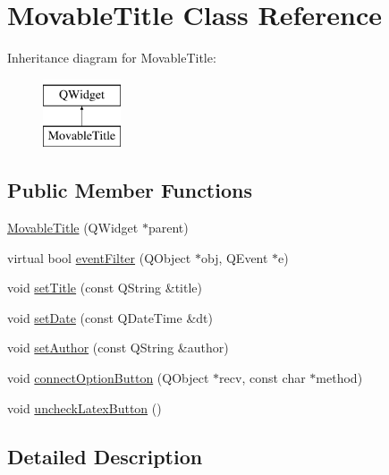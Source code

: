 \hypertarget{classMovableTitle}{\section{Movable\+Title Class Reference}
\label{classMovableTitle}
}
Inheritance diagram for Movable\+Title\+:\begin{figure}[H]
\begin{center}
\leavevmode
\includegraphics[height=2.000000cm]{classMovableTitle}
\end{center}
\end{figure}
\subsection*{Public Member Functions}
\begin{DoxyCompactItemize}
\item 
\hyperlink{classMovableTitle_a7e16a2ffdb1390da7703a866f8c313e8}{Movable\+Title} (Q\+Widget $\ast$parent)
\item 
virtual bool \hyperlink{classMovableTitle_a89e8506800e8f822069b3f879c7a3a26}{event\+Filter} (Q\+Object $\ast$obj, Q\+Event $\ast$e)
\item 
void \hyperlink{classMovableTitle_aad05a10ec583250589f72edca36395ea}{set\+Title} (const Q\+String \&title)
\item 
void \hyperlink{classMovableTitle_a9c2ec37093f90e0938fe392d2500d746}{set\+Date} (const Q\+Date\+Time \&dt)
\item 
void \hyperlink{classMovableTitle_aa9325778f8f301d2177c91654fbd3681}{set\+Author} (const Q\+String \&author)
\item 
void \hyperlink{classMovableTitle_a3bc4b1a5774fb18bd0b16260362d1b0d}{connect\+Option\+Button} (Q\+Object $\ast$recv, const char $\ast$method)
\item 
void \hyperlink{classMovableTitle_a5f9d3e74dfc3dd87c663e96ca2b01092}{uncheck\+Latex\+Button} ()
\end{DoxyCompactItemize}


\subsection{Detailed Description}


